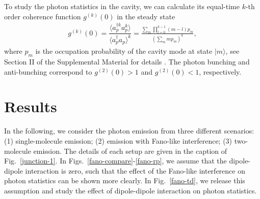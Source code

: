 \documentclass[aps,prb,
superscriptaddress,
,twocolumn
,floatfix,footinbib,longbibliography,
]{revtex4-2}
\begin{document}
To study the photon statistics in the cavity, we can calculate its equal-time $k$-th order coherence function $g^{(k)}(0)$ in the steady state
\begin{equation}
\begin{split}
g^{(k)}(0)=\dfrac{\langle a_{p}^{\dagger k} a_{p}^{k} \rangle}{\langle a_{p}^{\dagger} a_{p} \rangle^{k}}=\frac{\sum_{m}\prod_{l=0}^{k-1}(m-l)p_{m}}{(\sum_{m}mp_{m})^{k}},
\end{split}
\label{gn}
\end{equation}
where $p_{m}$ is the occupation probability of the cavity mode at state $|m\rangle$, see Section II of the Supplemental Material for details \cite{SupplementalMaterial}.
The photon bunching and anti-bunching correspond to $g^{(2)}(0)>1$ and $g^{(2)}(0)<1$, respectively.


\section{Results}
In the following, we consider the photon emission from three different scenarios: (1) single-molecule emission; (2) emission with Fano-like interference; (3) two-molecule emission. The details of each setup are given in the caption of Fig.~\ref{junction-1}. In Figs.~\ref{fano-compare}-\ref{fano-rp}, we assume that the dipole-dipole interaction is zero, such that the effect of the Fano-like interference on photon statistics can be shown more clearly. In Fig.~\ref{fano-td}, we release this assumption and study the effect of dipole-dipole interaction on photon statistics. 
%
\end{document}
